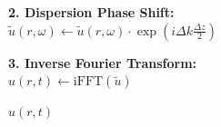\documentclass{article}
\begin{document}
\begin{algorithm}[H]
{{        \BlankLine
        \textbf{2. Dispersion Phase Shift:} \\
        $\tilde{u}(r, \omega) \gets \tilde{u}(r, \omega) \cdot \exp\left(i \Delta k \frac{\Delta z}{2}\right)$
        
        \BlankLine
        \textbf{3. Inverse Fourier Transform:} \\
        $u(r, t) \gets \text{iFFT}(\tilde{u})$
        
        \Return $u(r, t)$
    }
}

\caption{Linear Propagation Operators (\texttt{LinearOperator})}
\label{alg:linear_operator}
\end{algorithm}




\newpage
\end{document}
